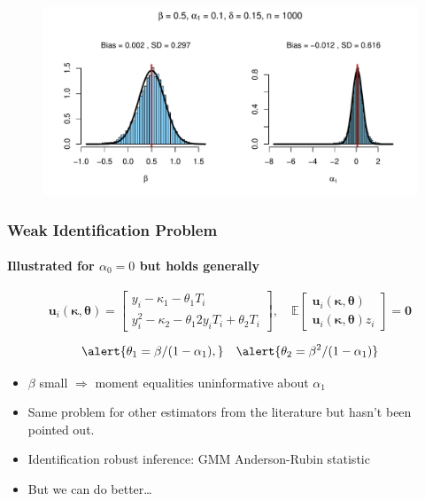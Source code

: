 \documentclass{beamer}
\begin{document}
\begin{frame}[plain,c]

  \begin{figure}[h]
    \centering
    \includegraphics[width=\textwidth]{Rplot9}
  \end{figure}

\end{frame}
\begin{frame}
  \frametitle{Weak Identification Problem}
  \framesubtitle{Illustrated for $\alpha_0 = 0$ but holds generally}

  \small
\[
  \mathbf{u}_i(\boldsymbol{\kappa}, \boldsymbol{\theta}) = \left[
  \begin{array}{l}
  y_i - \kappa_1 - \theta_1 T_i\\
  y^2_i - \kappa_2  - \theta_1 2y_iT_i + \theta_2 T_i
  \end{array}
\right], \quad
 \mathbb{E}
  \left[
  \begin{array}{l}
    \boldsymbol{u}_i(\boldsymbol{\kappa}, \boldsymbol{\theta}) \\ \mathbf{u}_i(\boldsymbol{\kappa}, \boldsymbol{\theta}) z_i
  \end{array}
\right] = \mathbf{0}
\]

\[
  \alert{\theta_1 = \beta / (1 - \alpha_1),} \quad
  \alert{\theta_2 = \beta^2 / (1 - \alpha_1)}
\] 

\begin{itemize}
  \item $\beta$ small $\Rightarrow$ moment equalities uninformative about $\alpha_1$
  \item Same problem for other estimators from the literature but hasn't been pointed out.
  \item Identification robust inference: GMM Anderson-Rubin statistic
  \item \alert{But we can do better\ldots}
\end{itemize}


\end{frame}
\end{document}
